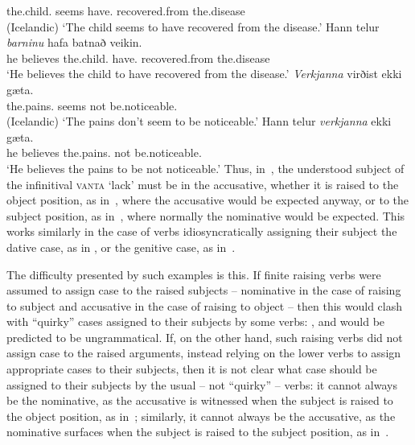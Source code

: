 \documentclass[output=paper,biblatex,babelshorthands,newtxmath,draftmode,colorlinks,citecolor=brown]{langscibook}
\begin{document}
      the.child.\DAT{} seems have.\INF{} recovered.from the.disease\\\hfill(Icelandic)
\glt `The child seems to have recovered from the disease.'
\ex
\gll Hann telur \emph{barninu} hafa batnað veikin. \\
      he believes the.child.\DAT{} have.\INF{} recovered.from the.disease\\
\glt `He believes the child to have recovered from the disease.'
\zl
\eal\label{isl:gen}
\ex
\gll  \emph{Verkjanna} virðist ekki g\ae{}ta. \\
      the.pains.\GEN{} seems not be.noticeable.\INF{}\\\hfill(Icelandic)
\glt `The pains don't seem to be noticeable.'
\ex
\gll Hann telur \emph{verkjanna} ekki g\ae{}ta. \\
      he believes the.pains.\GEN{} not be.noticeable.\INF{}\\
\glt `He believes the pains to be not noticeable.'
\zl
Thus, in~, the understood subject of the infinitival \textsc{vanta} `lack’ must be in the accusative, whether it is raised to the object position, as in~, where the accusative would be expected anyway, or to the subject position, as in~, where normally the nominative would be expected.  This works similarly in the case of verbs idiosyncratically assigning their subject the dative case, as in , or the genitive case, as in~.

The difficulty presented by such examples is this. If finite raising verbs were assumed to assign case to the raised subjects – nominative in the case of raising to subject and accusative in the case of raising to object – then this would clash with “quirky” cases assigned to their subjects by some verbs: ,  and  would be predicted to be ungrammatical.  If, on the other hand, such raising verbs did not assign case to the raised arguments, instead relying on the lower verbs to assign appropriate cases to their subjects, then it is not clear what case should be assigned to their subjects by the usual – not “quirky” – verbs: it cannot always be the nominative, as the accusative is witnessed when the subject is raised to the object position, as in~; similarly, it cannot always be the accusative, as the nominative surfaces when the subject is raised to the subject position, as in~.
\end{document}
